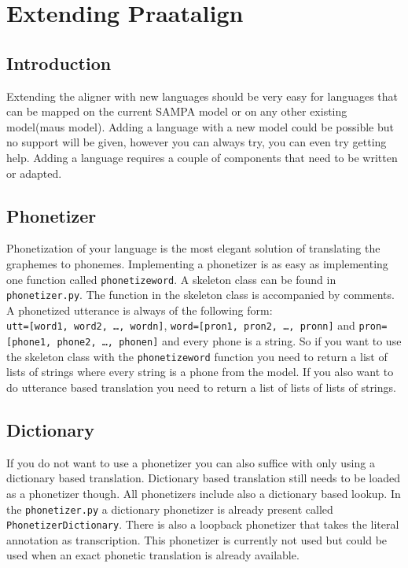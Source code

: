 \chapter{Extending Praatalign}
\section{Introduction}
Extending the aligner with new languages should be very easy for languages that
can be mapped on the current SAMPA model or on any other existing model(maus
model).
Adding a language with a new model could be possible but no support will be
given, however you can always try, you can even try getting help. Adding a
language requires a couple of components that need to be written or adapted.

\section{Phonetizer}
Phonetization of your language is the most elegant solution of translating the
graphemes to phonemes. Implementing a phonetizer is as easy as implementing one
function called \texttt{phonetizeword}. A skeleton class can be found in
\texttt{phonetizer.py}. The function in the skeleton class is accompanied by
comments. A phonetized utterance is always of the following form:\\
\texttt{utt=[word1, word2, \ldots, wordn]}, 
\texttt{word=[pron1, pron2, \ldots, pronn]} and
\texttt{pron=[phone1, phone2, \ldots, phonen]} and every phone is a string.
So if you want to use the skeleton class with the \texttt{phonetizeword}
function you need to return a list of lists of strings where every
string is a phone from the model. If you also want to do utterance based
translation you need to return a list of lists of lists of strings.

\section{Dictionary}
If you do not want to use a phonetizer you can also suffice with only using a
dictionary based translation. Dictionary based translation still needs to be
loaded as a phonetizer though. All phonetizers include also a dictionary based
lookup. In the \texttt{phonetizer.py} a dictionary phonetizer is already
present called \texttt{PhonetizerDictionary}. There is also a loopback
phonetizer that takes the literal annotation as transcription. This phonetizer
is currently not used but could be used when an exact phonetic translation is
already available.

